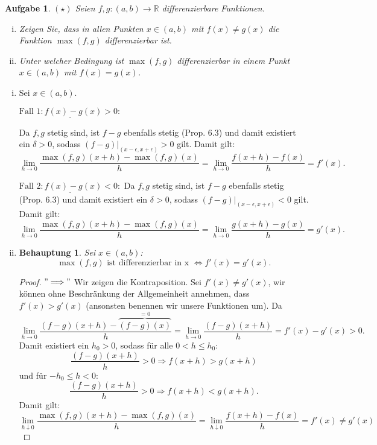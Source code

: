 \documentclass[a4paper, 20]{exam}
\newtheorem{ex}{Aufgabe}
\newtheorem{claim}{Behauptung}
\newcommand\RR{\mathbb{R}}
\begin{document}
\begin{ex}{$(\star)$}
Seien $f,g : (a,b) \longrightarrow \RR$ differenzierbare Funktionen.
\begin{enumerate}[i.)]
\item
Zeigen Sie, dass in allen Punkten $x\in (a,b)$ mit $f(x) \neq g(x)$ die Funktion $\max(f,g)$ differenzierbar ist.
\item
Unter welcher Bedingung ist $\max(f,g)$ differenzierbar in einem Punkt $x\in (a,b)$ mit $f(x)=g(x)$.
\end{enumerate}
\end{ex}
\begin{solution}
\begin{enumerate}[i.)]
\item
Sei $x\in (a,b)$.

$\underline{ \text{Fall }1:f(x)-g(x) >0:}$

Da $f,g$ stetig sind, ist $f-g$ ebenfalls stetig (Prop. 6.3) und damit existiert ein $\delta>0$, sodass $(f-g)|_{(x-\epsilon, x+\epsilon)}>0$ gilt. Damit gilt:
$$ \lim_{h\rightarrow 0} \frac{\max(f,g)(x+h) - \max(f,g)(x)}{h}
= \lim_{h\rightarrow 0} \frac{f(x+h) - f(x)}{h} = f'(x).$$

$\underline{ \text{Fall }2:f(x)-g(x) <0:}$
Da $f,g$ stetig sind, ist $f-g$ ebenfalls stetig (Prop. 6.3) und damit existiert ein $\delta>0$, sodass $(f-g)|_{(x-\epsilon, x+\epsilon)}<0$ gilt. Damit gilt:
$$ \lim_{h\rightarrow 0} \frac{\max(f,g)(x+h) - \max(f,g)(x)}{h}
= \lim_{h\rightarrow 0} \frac{g(x+h) - g(x)}{h} = g'(x).$$
\item
\begin{claim}
Sei $x\in (a,b)$:
$$ \max(f,g) \text{ ist differenzierbar in x } \Longleftrightarrow f'(x)=g'(x).$$
\end{claim}
\begin{proof}
$" \Longrightarrow "$ Wir zeigen die Kontraposition. Sei $f'(x)\neq g'(x)$, wir k\"onnen ohne Beschr\"ankung der Allgemeinheit annehmen, dass $f'(x) > g'(x)$ (ansonsten benennen wir unsere Funktionen um). Da $$\lim_{h \rightarrow 0} \frac{(f-g)(x+h)-\overbrace{(f-g)(x)}^{=0}}{h} 
=\lim_{h \rightarrow 0} \frac{(f-g)(x+h)}{h}= f'(x)-g'(x) >0.$$
Damit existiert ein $h_0>0$, sodass f\"ur alle $0<h\leq h_0$:
$$\frac{(f-g)(x+h)}{h} >0 \Longrightarrow f(x+h)>g(x+h)$$
und f\"ur $-h_0\leq h <0$:
$$\frac{(f-g)(x+h)}{h} >0 \Longrightarrow f(x+h)<g(x+h) .$$
Damit gilt:
$$ \lim_{h\downarrow 0} \frac{\max(f,g)(x+h) - \max(f,g)(x)}{h}
= \lim_{h\downarrow 0} \frac{f(x+h) - f(x)}{h} = f'(x) \neq g'(x)$$


\end{proof}
\end{enumerate}
\end{solution}
\end{document}
